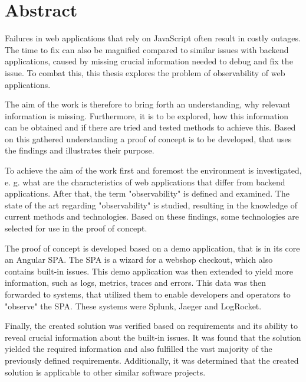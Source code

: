 \newpage{}

\section*{\thispagestyle{empty}Abstract}

Failures in web applications that rely on JavaScript often result in costly outages. The time to fix can also be magnified compared to similar issues with backend applications, caused by missing crucial information needed to debug and fix the issue. To combat this, this thesis explores the problem of observability of web applications.

The aim of the work is therefore to bring forth an understanding, why relevant information is missing. Furthermore, it is to be explored, how this information can be obtained and if there are tried and tested methods to achieve this. Based on this gathered understanding a proof of concept is to be developed, that uses the findings and illustrates their purpose.

To achieve the aim of the work first and foremost the environment is investigated, e. g. what are the characteristics of web applications that differ from backend applications. After that, the term "observability" is defined and examined. The state of the art regarding "observability" is studied, resulting in the knowledge of current methods and technologies. Based on these findings, some technologies are selected for use in the proof of concept.

The proof of concept is developed based on a demo application, that is in its core an Angular SPA. The SPA is a wizard for a webshop checkout, which also contains built-in issues. This demo application was then extended to yield more information, such as logs, metrics, traces and errors. This data was then forwarded to systems, that utilized them to enable developers and operators to "observe" the SPA. These systems were Splunk, Jaeger and LogRocket.

Finally, the created solution was verified based on requirements and its ability to reveal crucial information about the built-in issues. It was found that the solution yielded the required information and also fulfilled the vast majority of the previously defined requirements. Additionally, it was determined that the created solution is applicable to other similar software projects.